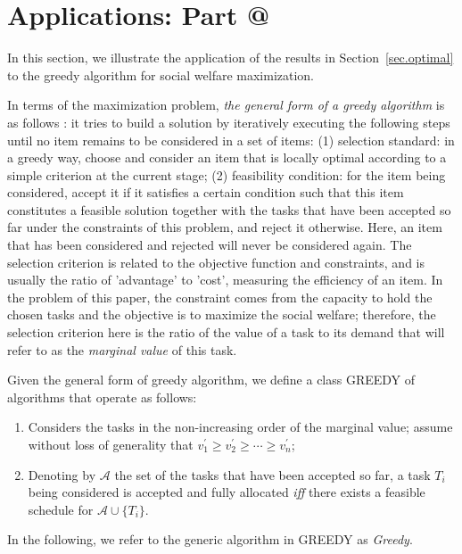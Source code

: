 \documentclass[10pt,journal,compsoc]{IEEEtran}
\makeatletter
\newcommand{\Rmnum}[1]{\expandafter\@slowromancap\romannumeral #1@}
\makeatother
\begin{document}
\section{Applications: Part \Rmnum{1}}
\label{more-application}


In this section, we illustrate the application of the results in Section~\ref{sec.optimal} to the greedy algorithm for social welfare maximization.




In terms of the maximization problem, {\em the general form of a greedy algorithm} is as follows \cite{Brassard,Even}: it tries to build a solution by iteratively executing the following steps until no item remains to be considered in a set of items: (1) selection standard: in a greedy way, choose and consider an item that is locally optimal according to a simple criterion at the current stage; (2) feasibility condition: for the item being considered, accept it if it satisfies a certain condition such that this item constitutes a feasible solution together with the tasks that have been accepted so far under the constraints of this problem, and reject it otherwise. Here, an item that has been considered and rejected will never be considered again. The selection criterion is related to the objective function and constraints, and is usually the ratio of 'advantage' to 'cost', measuring the efficiency of an item. In the problem of this paper, the constraint comes from the capacity to hold the chosen tasks and the objective is to maximize the social welfare; therefore, the selection criterion here is the ratio of the value of a task to its demand that will refer to as the {\em marginal value} of this task.

Given the general form of greedy algorithm, we define a class GREEDY of algorithms that operate as follows:
\begin{enumerate}
  \item Considers the tasks in the non-increasing order of the marginal value; assume without loss of generality that $v_{1}^{\prime}\geq v_{2}^{\prime}\geq  \cdots \geq v_{n}^{\prime}$;
  \item Denoting by $\mathcal{A}$ the set of the tasks that have been accepted so far, a task $T_{i}$ being considered is accepted and fully allocated {\em iff} there exists a feasible schedule for $\mathcal{A}\cup\{T_{i}\}$.
\end{enumerate}
In the following, we refer to the generic algorithm in GREEDY as {\em Greedy}.
\end{document}
